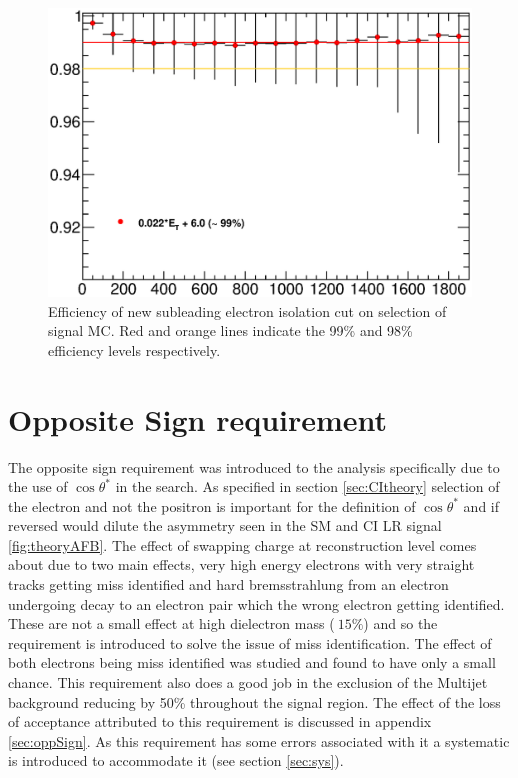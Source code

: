    \begin{figure}[h!]
      \begin{center}
      \includegraphics[scale=0.6]{images/C5_sub_iso_efficiency.eps}
      \end{center}
   \caption{Efficiency of new subleading electron isolation cut on selection of signal MC. Red and orange lines indicate the 99\% and 98\% efficiency levels respectively.}
   \label{fig:C5_sub_iso_efficiency}
   \end{figure}



\section{Opposite Sign requirement}

   The opposite sign requirement was introduced to the analysis specifically due to the use of $\cos{\theta^{*}}$ in the search. As specified in section \ref{sec:CItheory} selection of the electron and not the positron is important for the definition of $\cos{\theta^{*}}$ and if reversed would dilute the asymmetry seen in the SM and CI LR signal \ref{fig:theoryAFB}. The effect of swapping charge at reconstruction level comes about due to two main effects, very high energy electrons with very straight tracks getting miss identified and hard bremsstrahlung from an electron undergoing decay to an electron pair which the wrong electron getting identified. These are not a small effect at high dielectron mass ($~ 15\%$) and so the requirement is introduced to solve the issue of miss identification. The effect of both electrons being miss identified was studied and found to have only a small chance. This requirement also does a good job in the exclusion of the Multijet background reducing by 50\% throughout the signal region. The effect of the loss of acceptance attributed to this requirement is discussed in appendix \ref{sec:oppSign}. As this requirement has some errors associated with it a systematic is introduced to accommodate it (see section \ref{sec:sys}). 


